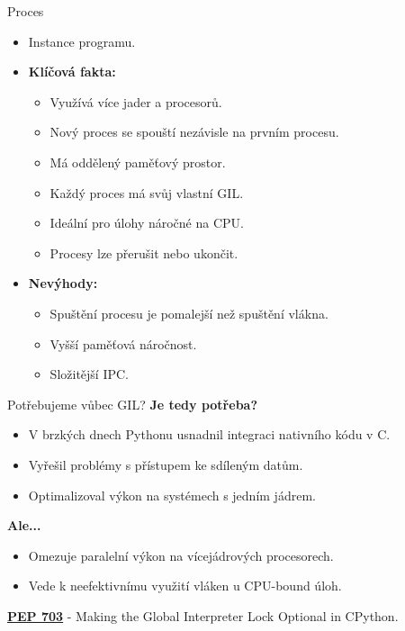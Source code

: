 \documentclass{beamer}
\begin{document}
\begin{frame}{Proces}
	\begin{itemize}
		\item Instance programu.
		\item \textbf{Klíčová fakta:}
			\begin{itemize}
				\item [\textendash] Využívá více jader a procesorů.
				\item [\textendash] Nový proces se spouští nezávisle na prvním procesu.
				\item [\textendash] Má oddělený paměťový prostor.
				\item [\textendash] Každý proces má svůj vlastní GIL.
				\item [\textendash] Ideální pro úlohy náročné na CPU.
				\item [\textendash] Procesy lze přerušit nebo ukončit.
			\end{itemize}
		\item \textbf{Nevýhody:}
			\begin{itemize}
				\item [\textendash] Spuštění procesu je pomalejší než spuštění vlákna.
				\item [\textendash] Vyšší paměťová náročnost.
				\item [\textendash] Složitější IPC.
			\end{itemize}
	\end{itemize}
\end{frame}

\begin{frame}{Potřebujeme vůbec GIL?}
	\textbf{Je tedy potřeba?}
	\begin{itemize}
		\item V brzkých dnech Pythonu usnadnil integraci nativního kódu v C.
		\item Vyřešil problémy s přístupem ke sdíleným datům.
		\item Optimalizoval výkon na systémech s jedním jádrem.
	\end{itemize}
	\textbf{Ale...}
	\begin{itemize}
		\item Omezuje paralelní výkon na vícejádrových procesorech.
		\item Vede k neefektivnímu využití vláken u CPU-bound úloh.
	\end{itemize}
	\textbf{\hypersetup{urlcolor=blue} \href{https://peps.python.org/pep-0703/}{PEP 703}} - Making the Global Interpreter Lock Optional in CPython.
\end{frame}
\end{document}
